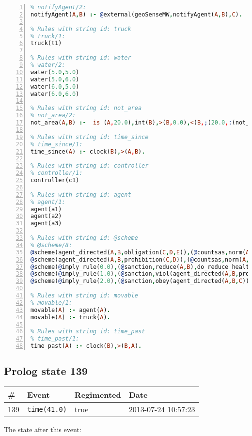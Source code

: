 \documentclass[11pt]{article}\usepackage[utf8]{inputenc}\usepackage{geometry}
\begin{document}
\begin{lstlisting}[language=Prolog, numbers=left]
% Rules with string id: notifyAgent
% notifyAgent/2:
notifyAgent(A,B) :- @external(geoSenseMW,notifyAgent(A,B),C).

% Rules with string id: truck
% truck/1:
truck(t1)

% Rules with string id: water
% water/2:
water(5.0,5.0)
water(5.0,6.0)
water(6.0,5.0)
water(6.0,6.0)

% Rules with string id: not_area
% not_area/2:
not_area(A,B) :-  is (A,20.0),int(B),>(B,0.0),<(B,;(20.0,:(not_area(A,B), is (-(B),20.0)))),int(A),>(A,0.0),<(A,;(20.0,:(area(A,B),-(int(A))))),int(B),>(A,0.0),>(B,0.0),<(A,21.0),<(B,21.0).

% Rules with string id: time_since
% time_since/1:
time_since(A) :- clock(B),>(A,B).

% Rules with string id: controller
% controller/1:
controller(c1)

% Rules with string id: agent
% agent/1:
agent(a1)
agent(a2)
agent(a3)

% Rules with string id: @scheme
% @scheme/8:
@scheme(agent_directed(A,B,obligation(C,D,E)),(@countsas,norm(A,B,F,obligation(C,D,E)),F),false,(listTrue(C)),(time_past(D)),false,[plus(viol(agent_directed(A,B,obligation(C,D,E))))|[]],[plus(obey(agent_directed(A,B,obligation(C,D,E))))|[]])
@scheme(agent_directed(A,B,prohibition(C,D)),(@countsas,norm(A,B,E,prohibition(C,D)),E),(listTrue(C)),false,(false),false,[plus(viol(agent_directed(A,B,prohibition(C,D))))|[]],[plus(obey(agent_directed(A,B,prohibition(C,D))))|[]])
@scheme(@imply_rule(0.0),(@sanction,reduce(A,B),do_reduce_health(A,B),notifyAgent(A,changed(status))),true,false,false,false,[min(reduce(A,B))|[]],[])
@scheme(@imply_rule(1.0),(@sanction,viol(agent_directed(A,B,prohibition(C,D))),do_sanction(D)),true,false,false,false,[min(viol(agent_directed(A,B,prohibition(C,D))))|[]],[])
@scheme(@imply_rule(2.0),(@sanction,obey(agent_directed(A,B,C))),true,false,false,false,[min(obey(agent_directed(A,B,C)))|[]],[])

% Rules with string id: movable
% movable/1:
movable(A) :- agent(A).
movable(A) :- truck(A).

% Rules with string id: time_past
% time_past/1:
time_past(A) :- clock(B),>(B,A).

\end{lstlisting}
\clearpage 
\subsection{Prolog state 139}
\begin{table}[ht]
\centering 
\begin{tabular}{l l l l} 
\textbf{\#} & \textbf{Event} & \textbf{Regimented} & \textbf{Date} \\ [0.5ex] 
\hline
139&\texttt{time(41.0)}&true&2013-07-24 10:57:23\\ [1ex] \hline\end{tabular}
\end{table}
The state after this event:
\end{document}
